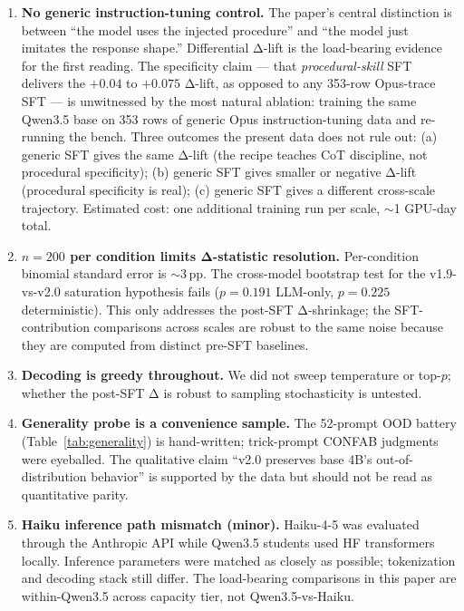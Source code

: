 \documentclass[10pt]{article}
\begin{document}
\begin{enumerate}[leftmargin=*]
  \item \textbf{No generic instruction-tuning control.} The paper's central distinction is between ``the model uses the injected procedure'' and ``the model just imitates the response shape.'' Differential Δ-lift is the load-bearing evidence for the first reading. The specificity claim --- that \emph{procedural-skill} SFT delivers the $+0.04$ to $+0.075$ Δ-lift, as opposed to any 353-row Opus-trace SFT --- is unwitnessed by the most natural ablation: training the same Qwen3.5 base on 353 rows of generic Opus instruction-tuning data and re-running the bench. Three outcomes the present data does not rule out: (a) generic SFT gives the same Δ-lift (the recipe teaches CoT discipline, not procedural specificity); (b) generic SFT gives smaller or negative Δ-lift (procedural specificity is real); (c) generic SFT gives a different cross-scale trajectory. Estimated cost: one additional training run per scale, $\sim$1 GPU-day total.

  \item \textbf{$n{=}200$ per condition limits Δ-statistic resolution.} Per-condition binomial standard error is $\sim$3\,pp. The cross-model bootstrap test for the v1.9-vs-v2.0 saturation hypothesis fails ($p{=}0.191$ LLM-only, $p{=}0.225$ deterministic). This only addresses the post-SFT Δ-shrinkage; the SFT-contribution comparisons across scales are robust to the same noise because they are computed from distinct pre-SFT baselines.

  \item \textbf{Decoding is greedy throughout.} We did not sweep temperature or top-$p$; whether the post-SFT Δ is robust to sampling stochasticity is untested.

  \item \textbf{Generality probe is a convenience sample.} The 52-prompt OOD battery (Table~\ref{tab:generality}) is hand-written; trick-prompt CONFAB judgments were eyeballed. The qualitative claim ``v2.0 preserves base 4B's out-of-distribution behavior'' is supported by the data but should not be read as quantitative parity.

  \item \textbf{Haiku inference path mismatch (minor).} Haiku-4-5 was evaluated through the Anthropic API while Qwen3.5 students used HF transformers locally. Inference parameters were matched as closely as possible; tokenization and decoding stack still differ. The load-bearing comparisons in this paper are within-Qwen3.5 across capacity tier, not Qwen3.5-vs-Haiku.
\end{enumerate}
\end{document}
